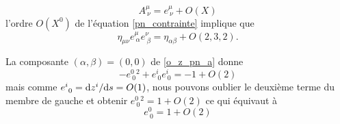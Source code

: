 			\begin{equation}
				A^\mu_{\ \nu}=e^\mu_{\ \nu}+O(X) 	
			\end{equation}
			l'ordre $O(X^0)$ de l'équation \ref{pn_contrainte} implique que
			\begin{equation}\label{o_z_pn_a}
				\eta_{\mu\nu}e^\mu_{\ \alpha}e^\nu_{\ \beta}=\eta_{\alpha\beta}+O(2,3,2).
			\end{equation}

			La composante $(\alpha,\beta)=(0,0)$ de \ref{o_z_pn_a} donne 
			\begin{equation}
				-e^0_{\ 0}^2 + e^i_{\ 0}e^i_{\ 0} = -1 + O(2)	
			\end{equation}
			mais comme $e^i_{\ 0}=\mathrm{d} z^i / \mathrm{d} s = O(1)$, nous pouvons oublier le deuxième terme du membre de gauche et obtenir $e^0_{\ 0}^2=1+O(2)$ ce qui équivaut à 
			\begin{equation}\label{e_0_0}
				e^0_{\ 0}=1+O(2)	
			\end{equation}

